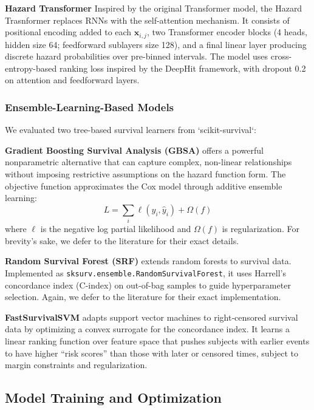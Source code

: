 \textbf{Hazard Transformer} Inspired by the original Transformer model\cite{vaswani2017attention}, the Hazard Trasnformer \cite{hazard_transformer} replaces RNNs with the self-attention mechanism. It consists of positional encoding added to each $\mathbf{x}_{i,j}$, two Transformer encoder blocks (4 heads, hidden size 64; feedforward sublayers size 128), and a final linear layer producing discrete hazard probabilities over pre-binned intervals. The model uses cross-entropy-based ranking loss inspired by the DeepHit framework, with dropout 0.2 on attention and feedforward layers.

\subsubsection{Ensemble-Learning-Based Models}

We evaluated two tree-based survival learners from `scikit-survival`:

\textbf{Gradient Boosting Survival Analysis (GBSA)} \cite{chen2013gradient_GBSA} offers a powerful nonparametric alternative that can capture complex, non-linear relationships without imposing restrictive assumptions on the hazard function form. The objective function approximates the Cox model through additive ensemble learning:
\[L = \sum_i \ell(y_i, \hat{y}_i) + \Omega(f)\]
where $\ell$ is the negative log partial likelihood and $\Omega(f)$ is regularization. For brevity's sake, we defer to the literature for their exact details.

\textbf{Random Survival Forest (SRF)} \cite{pickett2021random_survival_forests, ishwaran2008random} extends random forests to survival data. Implemented as \texttt{sksurv.ensemble.RandomSurvivalForest}, it uses Harrell's concordance index (C-index) on out-of-bag samples to guide hyperparameter selection. Again, we defer to the literature for their exact implementation. 

\textbf{FastSurvivalSVM} adapts support vector machines to right‐censored survival data by optimizing a convex surrogate for the concordance index. It learns a linear ranking function over feature space that pushes subjects with earlier events to have higher “risk scores” than those with later or censored times, subject to margin constraints and regularization.

\subsection{Model Training and Optimization}

